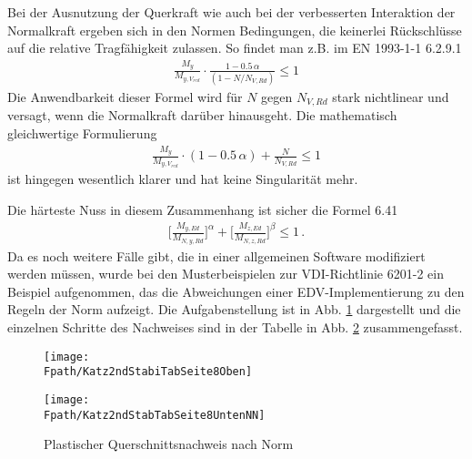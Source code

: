 Bei der Ausnutzung der Querkraft wie auch bei der verbesserten Interaktion der Normalkraft ergeben sich in den Normen Bedingungen, die keinerlei R\"{u}ckschl\"{u}sse auf die relative Tragf\"{a}higkeit zulassen. So findet man z.B. im EN 1993-1-1 6.2.9.1
\begin{align}
\frac{M_y}{M_{y, V_{red}}} \cdot \frac{1 - 0.5\,\alpha}{(1 - N/N_{V,Rd})} \leq 1
\end{align}
Die Anwendbarkeit dieser Formel wird f\"{u}r $N$ gegen $N_{V,Rd}$ stark nichtlinear und versagt, wenn die Normalkraft dar\"{u}ber hinausgeht. Die mathematisch gleichwertige Formulierung
\begin{align}\label{Eq23}
\frac{M_y}{M_{y, V_{red}}} \cdot (1 - 0.5\,\alpha) + \frac{N}{N_{V,Rd}} \leq 1
\end{align}	
ist hingegen wesentlich klarer und hat keine Singularit\"{a}t mehr.

Die h\"{a}rteste Nuss in diesem Zusammenhang ist sicher die Formel 6.41
\begin{align}
\bigg[\frac{M_{y,Ed}}{M_{N,y,Rd}}\bigg]^\alpha + \bigg[\frac{M_{z,Ed}}{M_{N,z,Rd}}\bigg]^\beta \leq 1\,.
\end{align}
Da es noch weitere F\"{a}lle gibt, die in einer allgemeinen Software modifiziert werden m\"{u}ssen, wurde bei den Musterbeispielen zur VDI-Richtlinie 6201-2 \cite{VDI} ein Beispiel aufgenommen, das die Abweichungen einer EDV-Implementierung zu den Regeln der Norm aufzeigt. Die Aufgabenstellung ist in Abb. \ref{Katz2ndStabiTabSeite8Oben} dargestellt und die einzelnen Schritte des Nachweises sind in der Tabelle in Abb. \ref{Katz2ndStabTabSeite8Unten} zusammengefasst.

\begin{figure}[tbp] \centering
\centering
\if {} \sidecaption[t] \fi
\texttt{[image: \\Fpath/Katz2ndStabiTabSeite8Oben]}
\caption{} \label{Katz2ndStabiTabSeite8Oben}
\end{figure}%

\begin{figure}[tbp] \centering
\centering
\if {} \sidecaption[t] \fi
\texttt{[image: \\Fpath/Katz2ndStabTabSeite8UntenNN]}
\caption{Plastischer Querschnittsnachweis nach Norm} \label{Katz2ndStabTabSeite8Unten}
\end{figure}%

